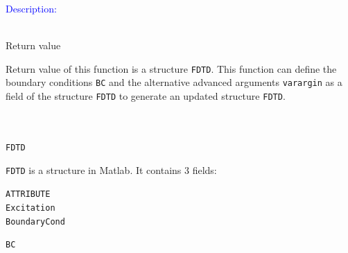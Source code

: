 	\textcolor{blue}{\begin{large}Description:\end{large}}\\
	      Return value 
	\begin{myindentpar}
      Return value of this function is a structure \texttt{FDTD}. This function can define the boundary conditions \texttt{BC} and the alternative advanced arguments \texttt{varargin} as a field of the structure  \texttt{FDTD} to generate an updated structure \texttt{FDTD}.  
      \end{myindentpar}
	      \\ \\
	\texttt{FDTD} 
  \begin{myindentpar}\texttt{FDTD}  is a structure in Matlab. It contains 3 fields:
       \begin{myindentpar}\texttt{ATTRIBUTE} \\
	      \texttt{Excitation} \\
	      \texttt{BoundaryCond}
      \end{myindentpar}
  \end{myindentpar}
	\texttt{BC}  
